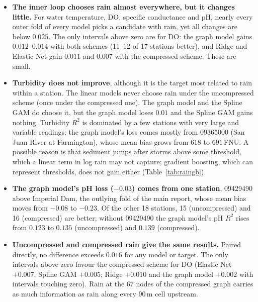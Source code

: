 \documentclass[11pt]{article}
\begin{document}
\begin{itemize}
  \item \textbf{The inner loop chooses rain almost everywhere, but it changes little.} For water
        temperature, DO, specific conductance and pH, nearly every outer fold of every model picks a
        candidate with rain, yet all changes are below $0.025$. The only intervals above zero are for
        DO: the graph model gains $0.012$--$0.014$ with both schemes (11--12 of 17 stations better),
        and Ridge and Elastic Net gain $0.011$ and $0.007$ with the compressed scheme. These are
        small.
  \item \textbf{Turbidity does not improve}, although it is the target most related to rain within
        a station. The linear models never choose rain under the uncompressed scheme (once under
        the compressed one). The graph model and the Spline GAM do choose it, but the graph model
        loses $0.01$ and the Spline GAM gains nothing. Turbidity $R^2$ is dominated by a few stations with very large and
        variable readings: the graph model's loss comes mostly from 09365000 (San Juan River at
        Farmington), whose mean bias grows from $618$ to $691$\,FNU. A possible reason is that sediment jumps after storms above some threshold, which a linear
        term in log rain may not capture; gradient boosting, which can represent thresholds, does
        not gain either (Table~\ref{tab:raingb}).
  \item \textbf{The graph model's pH loss ($-0.03$) comes from one station}, 09429490 above
        Imperial Dam, the outlying fold of the main report, whose mean bias moves from $-0.08$ to
        $-0.23$. Of the other 18 stations, 15 (uncompressed) and 16 (compressed) are better; without
        09429490 the graph model's pH $R^2$ rises from $0.123$ to $0.135$ (uncompressed) and $0.139$
        (compressed).
  \item \textbf{Uncompressed and compressed rain give the same results.} Paired directly, no
        difference exceeds $0.016$ for any model or target. The only intervals above zero favour the
        compressed scheme for DO (Elastic Net $+0.007$, Spline GAM $+0.005$; Ridge $+0.010$ and the
        graph model $+0.002$ with intervals touching zero). Rain at the 67 nodes of the compressed graph
        carries as much information as rain along every 90\,m cell upstream.
\end{itemize}
\end{document}
